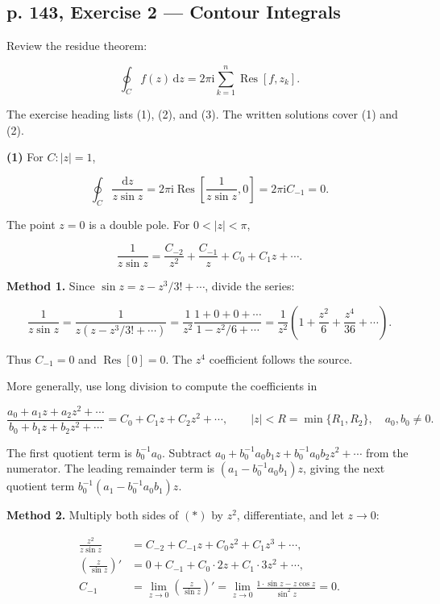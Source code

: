 \documentclass[11pt,a4paper]{article}
\theoremstyle{definition}
\theoremstyle{plain}
\begin{document}
\subsection{p. 143, Exercise 2 --- Contour Integrals}

Review the residue theorem:

\[
\oint_C f(z)\,\mathrm{d}z=2\pi \mathrm{i}\sum_{k=1}^n\operatorname{Res}[f,z_k].
\]

The exercise heading lists (1), (2), and (3). The written solutions cover (1) and (2).

\textbf{(1)} For $C:|z|=1$,

\[
\oint_C\frac{\mathrm{d}z}{z\sin z}=2\pi \mathrm{i}\operatorname{Res}\left[\frac1{z\sin z},0\right]
=2\pi \mathrm{i}C_{-1}=0.
\]

The point $z=0$ is a double pole. For $0<|z|<\pi$,

\begin{equation*}
\frac1{z\sin z}=\frac{C_{-2}}{z^2}+\frac{C_{-1}}z+C_0+C_1z+\cdots. \tag{*}
\end{equation*}

\textbf{Method 1.} Since $\sin z=z-z^3/3!+\cdots$, divide the series:

\[
\frac1{z\sin z}=\frac1{z(z-z^3/3!+\cdots)}
=\frac1{z^2}\frac{1+0+0+\cdots}{1-z^2/6+\cdots}
=\frac1{z^2}\left(1+\frac{z^2}{6}+\frac{z^4}{36}+\cdots\right).
\]

Thus $C_{-1}=0$ and $\operatorname{Res}[0]=0$. The $z^4$ coefficient follows the source.

More generally, use long division to compute the coefficients in

\[
\frac{a_0+a_1z+a_2z^2+\cdots}{b_0+b_1z+b_2z^2+\cdots}
=C_0+C_1z+C_2z^2+\cdots,\qquad |z|<R=\min\{R_1,R_2\},\quad a_0,b_0\ne0.
\]

The first quotient term is $b_0^{-1}a_0$. Subtract $a_0+b_0^{-1}a_0b_1z+b_0^{-1}a_0b_2z^2+\cdots$ from the numerator. The leading remainder term is $(a_1-b_0^{-1}a_0b_1)z$, giving the next quotient term $b_0^{-1}(a_1-b_0^{-1}a_0b_1)z$.

\textbf{Method 2.} Multiply both sides of $(*)$ by $z^2$, differentiate, and let $z\to0$:

\[
\begin{aligned}
\frac{z^2}{z\sin z}&=C_{-2}+C_{-1}z+C_0z^2+C_1z^3+\cdots,\\
\left(\frac z{\sin z}\right)'&=0+C_{-1}+C_0\cdot2z+C_1\cdot3z^2+\cdots,\\
C_{-1}&=\lim_{z\to0}\left(\frac z{\sin z}\right)'
=\lim_{z\to0}\frac{1\cdot\sin z-z\cos z}{\sin^2 z}=0.
\end{aligned}
\]
\end{document}
